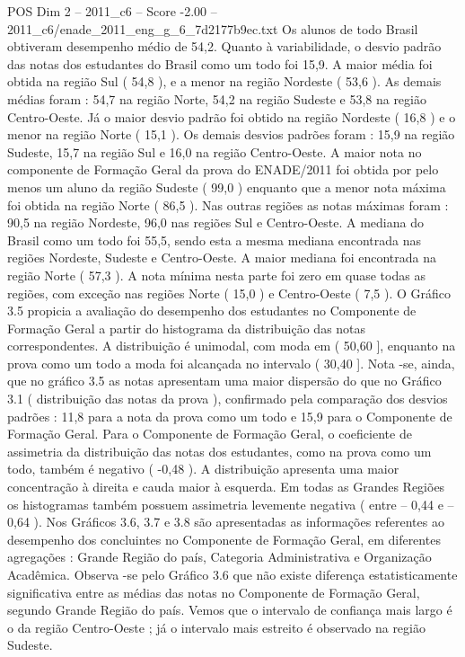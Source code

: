 \begin{textsample}{POS Dim 2 – 2011\_c6 – Score -2.00 – 2011\_c6/enade\_2011\_eng\_g\_6\_7d2177b9ec.txt}
Os alunos de todo Brasil obtiveram desempenho médio de 54,2.
Quanto à variabilidade, o desvio padrão das notas dos estudantes do Brasil como um todo foi 15,9.
A maior média foi obtida na região Sul ( 54,8 ), e a menor na região Nordeste ( 53,6 ).
As demais médias foram : 54,7 na região Norte, 54,2 na região Sudeste e 53,8 na região Centro-Oeste.
Já o maior desvio padrão foi obtido na região Nordeste ( 16,8 ) e o menor na região Norte ( 15,1 ).
Os demais desvios padrões foram : 15,9 na região Sudeste, 15,7 na região Sul e 16,0 na região Centro-Oeste.
A maior nota no componente de Formação Geral da prova do ENADE/2011 foi obtida por pelo menos um aluno da região Sudeste ( 99,0 ) enquanto que a menor nota máxima foi obtida na região Norte ( 86,5 ).
Nas outras regiões as notas máximas foram : 90,5 na região Nordeste, 96,0 nas regiões Sul e Centro-Oeste.
A mediana do Brasil como um todo foi 55,5, sendo esta a mesma mediana encontrada nas regiões Nordeste, Sudeste e Centro-Oeste.
A maior mediana foi encontrada na região Norte ( 57,3 ).
A nota mínima nesta parte foi zero em quase todas as regiões, com exceção nas regiões Norte ( 15,0 ) e Centro-Oeste ( 7,5 ).
O Gráfico 3.5 propicia a avaliação do desempenho dos estudantes no Componente de Formação Geral a partir do histograma da distribuição das notas correspondentes.
A distribuição é unimodal, com moda em ( 50,60 ], enquanto na prova como um todo a moda foi alcançada no intervalo ( 30,40 ].
Nota -se, ainda, que no gráfico 3.5 as notas apresentam uma maior dispersão do que no Gráfico 3.1 ( distribuição das notas da prova ), confirmado pela comparação dos desvios padrões : 11,8 para a nota da prova como um todo e 15,9 para o Componente de Formação Geral.
Para o Componente de Formação Geral, o coeficiente de assimetria da distribuição das notas dos estudantes, como na prova como um todo, também é negativo ( -0,48 ).
A distribuição apresenta uma maior concentração à direita e cauda maior à esquerda.
Em todas as Grandes Regiões os histogramas também possuem assimetria levemente negativa ( entre – 0,44 e – 0,64 ).
Nos Gráficos 3.6, 3.7 e 3.8 são apresentadas as informações referentes ao desempenho dos concluintes no Componente de Formação Geral, em diferentes agregações : Grande Região do país, Categoria Administrativa e Organização Acadêmica.
Observa -se pelo Gráfico 3.6 que não existe diferença estatisticamente significativa entre as médias das notas no Componente de Formação Geral, segundo Grande Região do país.
Vemos que o intervalo de confiança mais largo é o da região Centro-Oeste ; já o intervalo mais estreito é observado na região Sudeste.

\end{textsample}
